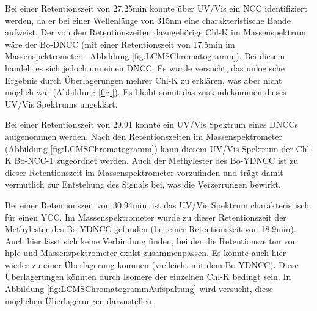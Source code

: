 Bei einer Retentionszeit von 27.25min konnte über UV/Vis ein \gls{NCC} identifiziert werden, da er bei einer Wellenlänge von 315nm eine charakteristische Bande aufweist. Der von den Retentionszeiten dazugehörige \gls{Chl-K} im Massenspektrum wäre der Bo-DNCC (mit einer Retentionszeit von 17.5min im Massenspektrometer - Abbildung \ref{fig:LCMSChromatogramm}). Bei diesem handelt es sich jedoch um einen \gls{DNCC}. Es wurde versucht, das unlogische Ergebnis durch Überlagerungen mehrer \gls{Chl-K} zu erklären, was aber nicht möglich war (Abbildung \ref{fig:}). Es bleibt somit das zustandekommen dieses UV/Vis Spektrums ungeklärt. 

Bei einer Retentionszeit von 29.91 konnte ein UV/Vis Spektrum eines \gls{DNCC}s aufgenommen werden. Nach den Retentionszeiten im Massenspektrometer (Abbildung \ref{fig:LCMSChromatogramm}) kann diesem UV/Vis Spektrum der \gls{Chl-K} Bo-NCC-1 zugeordnet werden. Auch der Methylester des Bo-YDNCC ist zu dieser Retentionszeit im Massenspektrometer vorzufinden und trägt damit vermutlich zur Entstehung des Signals bei, was die Verzerrungen bewirkt.

Bei einer Retentionszeit von 30.94min. ist das UV/Vis Spektrum charakteristisch für einen \gls{YCC}. Im Massenspektrometer wurde zu dieser Retentionszeit der Methylester des Bo-YDNCC gefunden (bei einer Retentionszeit von 18.9min). Auch hier lässt sich keine Verbindung finden, bei der die Retentionszeiten von \gls{hplc} und Massenspektrometer exakt zusammenpassen. Es könnte auch hier wieder zu einer Überlagerung kommen (vielleicht mit dem Bo-YDNCC). Diese Überlagerungen könnten durch Isomere der einzelnen \gls{Chl-K} bedingt sein. In Abbildung \ref{fig:LCMSChromatogrammAufspaltung} wird versucht, diese möglichen Überlagerungen darzustellen.  


